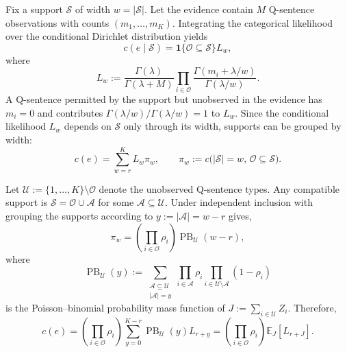 \documentclass[10pt, conference, letterpaper]{ IEEEtran}
\theoremstyle{bfnote}
\begin{document}
Fix a support $\mathcal{S}$ of width $w=|\mathcal{S}|$. Let the evidence
contain $M$ Q-sentence observations with counts $(m_1,\ldots,m_K)$. Integrating the
categorical likelihood over the conditional Dirichlet distribution yields
\begin{equation}
\label{eq:rsdc-inner}
c(e\mid\mathcal{S})
=
\mathbf{1}\{\mathcal{O}\subseteq\mathcal{S}\}L_w,
\end{equation}
where
\begin{equation}
\label{eq:rsdc-Lw}
L_w
:=
\frac{\Gamma(\lambda)}{\Gamma(\lambda+M)}
\prod_{i\in\mathcal{O}}
\frac{\Gamma(m_i+\lambda/w)}{\Gamma(\lambda/w)}.
\end{equation}
A Q-sentence permitted by the support but unobserved in the evidence has $m_i=0$ and contributes
$\Gamma(\lambda/w)/\Gamma(\lambda/w)=1$ to $L_w$. Since the conditional likelihood $L_w$ depends on
$\mathcal{S}$ only through its width, supports can be grouped by width:
\begin{equation}
\label{eq:rsdc-sizesum}
c(e)
=
\sum_{w=r}^{K}L_w\pi_w,
\qquad
\pi_w
:=
c\bigl(
    |\mathcal{S}|=w,\,
    \mathcal{O}\subseteq\mathcal{S}
\bigr).
\end{equation}


Let $\mathcal{U}:=\{1,\ldots,K\}\setminus\mathcal{O}$ denote the unobserved Q-sentence
types. Any compatible support is
$\mathcal{S}=\mathcal{O}\cup\mathcal{A}$ for some
$\mathcal{A}\subseteq\mathcal{U}$. Under independent inclusion with grouping the supports according to
$y:=|\mathcal{A}|=w-r$ gives,
\begin{equation}
\label{eq:rsdc-poissonbinom}
\pi_w
=
\left(\prod_{i\in\mathcal{O}}\rho_i\right)
\operatorname{PB}_{\mathcal{U}}(w-r),
\end{equation}
where
\[
\operatorname{PB}_{\mathcal{U}}(y)
:=
\sum_{\substack{\mathcal{A}\subseteq\mathcal{U}\\|\mathcal{A}|=y}}
\prod_{i\in\mathcal{A}}\rho_i
\prod_{i\in\mathcal{U}\setminus\mathcal{A}}(1-\rho_i)
\]
is the Poisson--binomial probability mass function of
$J:=\sum_{i\in\mathcal{U}}Z_i$. Therefore,
\begin{equation}
\label{eq:rsdc-expectation}
c(e)
=
\left(\prod_{i\in\mathcal{O}}\rho_i\right)
\sum_{y=0}^{K-r}
\operatorname{PB}_{\mathcal{U}}(y)L_{r+y}
=
\left(\prod_{i\in\mathcal{O}}\rho_i\right)
\mathbb{E}_{J}[L_{r+J}].
\end{equation}
\end{document}
